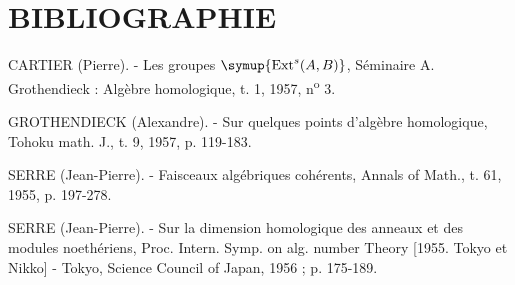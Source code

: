 \section*{\centering\normalfont BIBLIOGRAPHIE}

\noindent[1] CARTIER (Pierre). - Les groupes
$\symup{\operatorname{Ext}^{s}(A,B)}$, Séminaire A. Grothendieck : Algèbre homologique,
t. 1, 1957, n\textsuperscript{o} 3.

\noindent[2] GROTHENDIECK (Alexandre). - Sur quelques points d'algèbre
homologique, Tohoku math. J., t. 9, 1957, p. 119-183.

\noindent[3] SERRE (Jean-Pierre). - Faisceaux algébriques cohérents,
Annals of Math., t. 61, 1955, p. 197-278.

\noindent[4] SERRE (Jean-Pierre). - Sur la dimension homologique des anneaux
et des modules noethériens, Proc. Intern. Symp. on alg. number Theory
[1955. Tokyo et Nikko] - Tokyo, Science Council of Japan, 1956 ;
p. 175-189.

\clearpage
